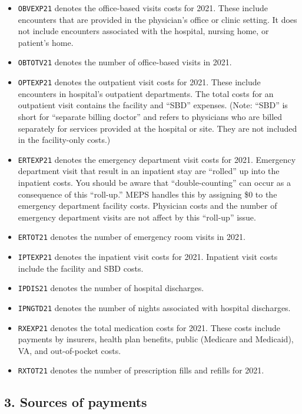 \documentclass[
]{book}
\begin{document}
\begin{itemize}
\item
  \texttt{OBVEXP21} denotes the office-based visits costs for 2021. These include encounters that are provided in the physician's office or clinic setting. It does not include encounters associated with the hospital, nursing home, or patient's home.
\item
  \texttt{OBTOTV21} denotes the number of office-based visits in 2021.
\item
  \texttt{OPTEXP21} denotes the outpatient visit costs for 2021. These include encounters in hospital's outpatient departments. The total costs for an outpatient visit contains the facility and ``SBD'' expenses. (Note: ``SBD'' is short for ``separate billing doctor'' and refers to physicians who are billed separately for services provided at the hospital or site. They are not included in the facility-only costs.)
\item
  \texttt{ERTEXP21} denotes the emergency department visit costs for 2021. Emergency department visit that result in an inpatient stay are ``rolled'' up into the inpatient costs. You should be aware that ``double-counting'' can occur as a consequence of this ``roll-up.'' MEPS handles this by assigning \$0 to the emergency department facility costs. Physician costs and the number of emergency department visits are not affect by this ``roll-up'' issue.
\item
  \texttt{ERTOT21} denotes the number of emergency room visits in 2021.
\item
  \texttt{IPTEXP21} denotes the inpatient visit costs for 2021. Inpatient visit costs include the facility and SBD costs.
\item
  \texttt{IPDIS21} denotes the number of hospital discharges.
\item
  \texttt{IPNGTD21} denotes the number of nights associated with hospital discharges.
\item
  \texttt{RXEXP21} denotes the total medication costs for 2021. These costs include payments by insurers, health plan benefits, public (Medicare and Medicaid), VA, and out-of-pocket costs.
\item
  \texttt{RXTOT21} denotes the number of prescription fills and refills for 2021.
\end{itemize}

\hypertarget{sources-of-payments}{%
\subsection{3. Sources of payments}\label{sources-of-payments}}
\end{document}
